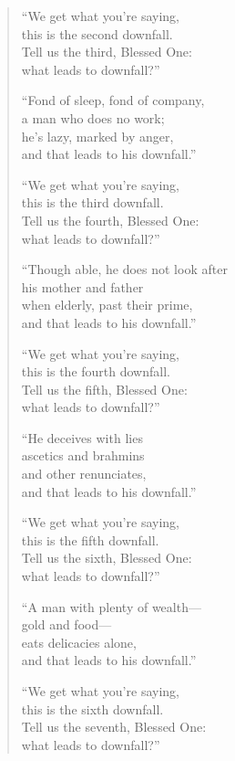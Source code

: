 \documentclass[12pt,openany]{book}%
\begin{document}
\begin{verse}
“We get what you’re saying, \\
this is the second downfall. \\
Tell us the third, Blessed One: \\
what leads to downfall?” 

“Fond of sleep, fond of company, \\
a man who does no work; \\
he’s lazy, marked by anger, \\
and that leads to his downfall.” 

“We get what you’re saying, \\
this is the third downfall. \\
Tell us the fourth, Blessed One: \\
what leads to downfall?” 

“Though able, he does not look after \\
his mother and father \\
when elderly, past their prime, \\
and that leads to his downfall.” 

“We get what you’re saying, \\
this is the fourth downfall. \\
Tell us the fifth, Blessed One: \\
what leads to downfall?” 

“He deceives with lies \\
ascetics and brahmins \\
and other renunciates, \\
and that leads to his downfall.” 

“We get what you’re saying, \\
this is the fifth downfall. \\
Tell us the sixth, Blessed One: \\
what leads to downfall?” 

“A man with plenty of wealth—\\
gold and food—\\
eats delicacies alone, \\
and that leads to his downfall.” 

“We get what you’re saying, \\
this is the sixth downfall. \\
Tell us the seventh, Blessed One: \\
what leads to downfall?” 


\end{verse}
\end{document}
